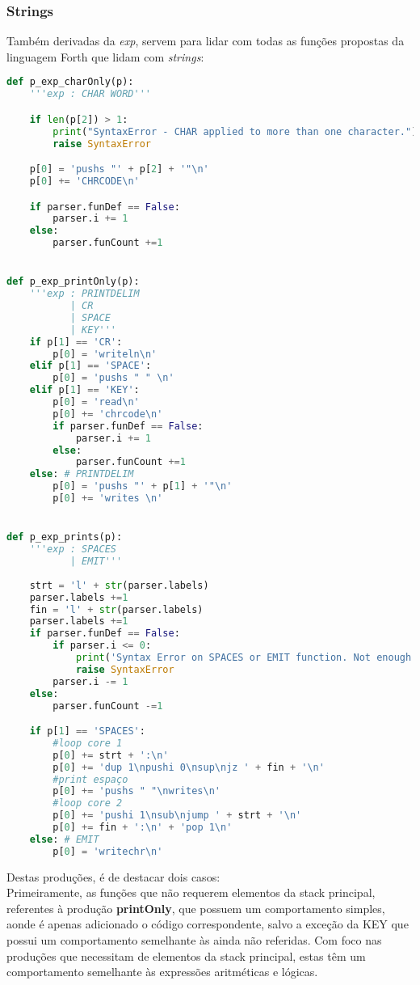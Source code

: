 \documentclass{predef}
\begin{document}
\subsubsection{Strings}
Também derivadas da \textit{exp}, servem para lidar com todas as funções propostas da linguagem Forth que lidam com \textit{strings}:
\begin{lstlisting}[language=Python]
    def p_exp_charOnly(p):
    '''exp : CHAR WORD'''

    if len(p[2]) > 1:
        print("SyntaxError - CHAR applied to more than one character.")
        raise SyntaxError

    p[0] = 'pushs "' + p[2] + '"\n'
    p[0] += 'CHRCODE\n'

    if parser.funDef == False:
        parser.i += 1
    else:
        parser.funCount +=1


def p_exp_printOnly(p):
    '''exp : PRINTDELIM
           | CR
           | SPACE
           | KEY'''
    if p[1] == 'CR':
        p[0] = 'writeln\n'
    elif p[1] == 'SPACE':
        p[0] = 'pushs " " \n'
    elif p[1] == 'KEY':
        p[0] = 'read\n'
        p[0] += 'chrcode\n'
        if parser.funDef == False:
            parser.i += 1
        else:
            parser.funCount +=1
    else: # PRINTDELIM
        p[0] = 'pushs "' + p[1] + '"\n'
        p[0] += 'writes \n'


def p_exp_prints(p):
    '''exp : SPACES 
           | EMIT'''
    
    strt = 'l' + str(parser.labels) 
    parser.labels +=1
    fin = 'l' + str(parser.labels) 
    parser.labels +=1
    if parser.funDef == False:
        if parser.i <= 0:
            print('Syntax Error on SPACES or EMIT function. Not enough arguments.\n')
            raise SyntaxError
        parser.i -= 1
    else:
        parser.funCount -=1

    if p[1] == 'SPACES':
        #loop core 1
        p[0] += strt + ':\n'
        p[0] += 'dup 1\npushi 0\nsup\njz ' + fin + '\n'
        #print espaço
        p[0] += 'pushs " "\nwrites\n'
        #loop core 2
        p[0] += 'pushi 1\nsub\njump ' + strt + '\n'
        p[0] += fin + ':\n' + 'pop 1\n'
    else: # EMIT
        p[0] = 'writechr\n'
\end{lstlisting}
Destas produções, é de destacar dois casos:\\
Primeiramente, as funções que não requerem elementos da stack principal, referentes à produção \textbf{printOnly}, que possuem um comportamento simples, aonde é apenas adicionado o código correspondente, salvo a exceção da KEY que possui um comportamento semelhante às ainda não referidas. Com foco nas produções que necessitam de elementos da stack principal, estas têm um comportamento semelhante às expressões aritméticas e lógicas.
\end{document}
